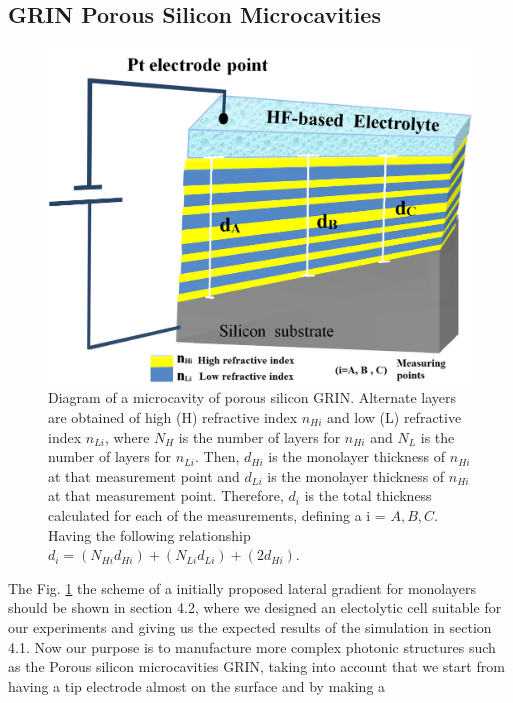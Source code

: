 \documentclass{article}
\begin{document}
\subsection{GRIN Porous Silicon Microcavities}
 \begin{figure}
	\centering
	\includegraphics[width=\textwidth]{Images/MicrGrin}
	\caption{Diagram of a microcavity of porous silicon
            GRIN. Alternate layers are obtained of high (H) refractive
            index $n_{Hi}$ and low (L) refractive index
            $n_{Li}$, where $N_H$ is the number of layers for
            $n_{Hi}$ and $N_L$ is the number of layers for
            $n_{Li}$. Then,  $d_{Hi}$ is the monolayer thickness
            of  $n_{Hi}$ at that measurement point and $d_{Li}$
            is the monolayer thickness of $n_{Hi}$ at that
            measurement point. Therefore,  $d_i$ is the total
            thickness calculated for each of the measurements,
            defining a i = $ A, B, C$. Having the following
            relationship $d_i =(N_{Hi}d_{Hi})+(N_{Li}d_{Li}) +
            (2d_{Hi})$. }
	\label{fig:MCGRIN0}
\end{figure}
The Fig. \ref{fig:MCGRIN0} the scheme of  a initially proposed lateral
gradient for monolayers should be shown in section 4.2, where we
designed an electolytic cell suitable for our experiments and giving
us the expected results of the simulation in section 4.1. Now our
purpose is to manufacture more complex photonic structures such as the
Porous silicon microcavities GRIN, taking into account that we start
from having a tip electrode almost on the surface and by making a
\end{document}
